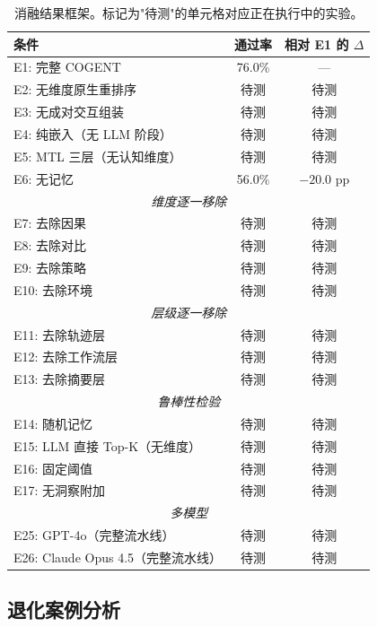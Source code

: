 \documentclass[UTF8,twocolumn]{ctexart}
\begin{document}
\begin{table}[t]
\centering
\caption{消融结果框架。标记为"待测"的单元格对应正在执行中的实验。}
\label{tab:ablation-results-cn}
\begin{tabular}{lcc}
\toprule
\textbf{条件} & \textbf{通过率} & \textbf{相对 E1 的 $\Delta$} \\
\midrule
E1: 完整 \textsc{COGENT} & 76.0\% & --- \\
E2: 无维度原生重排序 & 待测 & 待测 \\
E3: 无成对交互组装 & 待测 & 待测 \\
E4: 纯嵌入（无 LLM 阶段） & 待测 & 待测 \\
E5: MTL 三层（无认知维度） & 待测 & 待测 \\
E6: 无记忆 & 56.0\% & $-20.0$ pp \\
\midrule
\multicolumn{3}{c}{\textit{维度逐一移除}} \\
\midrule
E7: 去除因果 & 待测 & 待测 \\
E8: 去除对比 & 待测 & 待测 \\
E9: 去除策略 & 待测 & 待测 \\
E10: 去除环境 & 待测 & 待测 \\
\midrule
\multicolumn{3}{c}{\textit{层级逐一移除}} \\
\midrule
E11: 去除轨迹层 & 待测 & 待测 \\
E12: 去除工作流层 & 待测 & 待测 \\
E13: 去除摘要层 & 待测 & 待测 \\
\midrule
\multicolumn{3}{c}{\textit{鲁棒性检验}} \\
\midrule
E14: 随机记忆 & 待测 & 待测 \\
E15: LLM 直接 Top-K（无维度） & 待测 & 待测 \\
E16: 固定阈值 & 待测 & 待测 \\
E17: 无洞察附加 & 待测 & 待测 \\
\midrule
\multicolumn{3}{c}{\textit{多模型}} \\
\midrule
E25: GPT-4o（完整流水线） & 待测 & 待测 \\
E26: Claude Opus 4.5（完整流水线） & 待测 & 待测 \\
\bottomrule
\end{tabular}
\end{table}

\subsection{退化案例分析}
\end{document}
